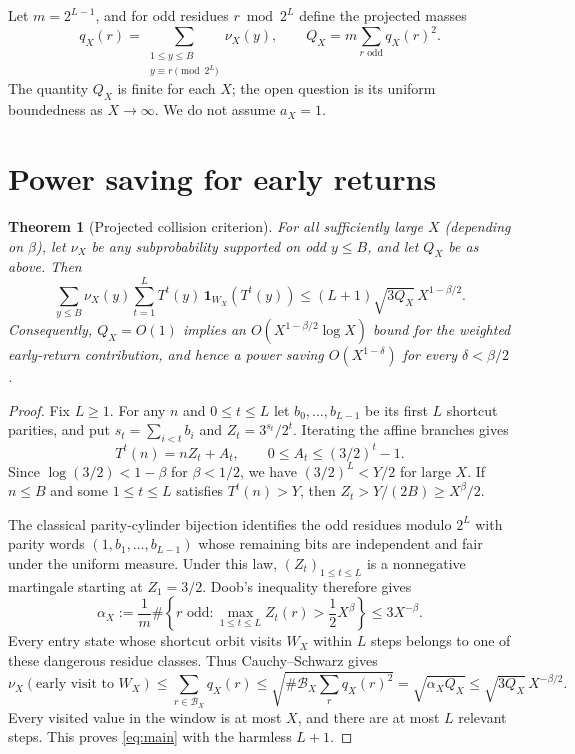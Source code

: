 \documentclass[11pt]{amsart}
\newtheorem{theorem}{Theorem}
\theoremstyle{remark}
\newcommand{\1}{\mathbf1}
\begin{document}
Let $m=2^{L-1}$, and for odd residues $r\bmod2^L$ define the projected masses
\[
 q_X(r)=\sum_{\substack{1\le y\le B\\y\equiv r\pmod{2^L}}}\nu_X(y),\qquad
 \boxed{Q_X=m\sum_{r\text{ odd}}q_X(r)^2.}
\]
The quantity $Q_X$ is finite for each $X$; the open question is its uniform boundedness as $X\to\infty$. We do not assume $a_X=1$.

\section{Power saving for early returns}
\begin{theorem}[Projected collision criterion]\label{thm:main}
For all sufficiently large $X$ (depending on $\beta$), let $\nu_X$ be any subprobability supported on odd $y\le B$, and let $Q_X$ be as above. Then
\begin{equation}\label{eq:main}
 \sum_{y\le B}\nu_X(y)\sum_{t=1}^{L}
 T^t(y)\,\1_{W_X}(T^t(y))
 \le (L+1)\sqrt{3Q_X}\,X^{1-\beta/2}.
\end{equation}
Consequently, $Q_X=O(1)$ implies an $O(X^{1-\beta/2}\log X)$ bound for the weighted \emph{early-return} contribution, and hence a power saving $O(X^{1-\delta})$ for every $\delta<\beta/2$.
\end{theorem}
\begin{proof}
Fix $L\ge1$. For any $n$ and $0\le t\le L$ let $b_0,\ldots,b_{L-1}$ be its first $L$ shortcut parities, and put $s_t=\sum_{i<t}b_i$ and $Z_t=3^{s_t}/2^t$. Iterating the affine branches gives
\[
 T^t(n)=nZ_t+A_t,\qquad 0\le A_t\le(3/2)^t-1.
\]
Since $\log(3/2)<1-\beta$ for $\beta<1/2$, we have $(3/2)^L<Y/2$ for large $X$.  If $n\le B$ and some $1\le t\le L$ satisfies $T^t(n)>Y$, then $Z_t>Y/(2B)\ge X^\beta/2$.

The classical parity-cylinder bijection identifies the odd residues modulo $2^L$ with parity words $(1,b_1,\ldots,b_{L-1})$ whose remaining bits are independent and fair under the uniform measure.  Under this law, $(Z_t)_{1\le t\le L}$ is a nonnegative martingale starting at $Z_1=3/2$.  Doob's inequality therefore gives
\[
 \alpha_X:=\frac1m\#\left\{r\text{ odd}:\max_{1\le t\le L} Z_t(r)>\frac12X^\beta\right\}
 \le3X^{-\beta}.
\]
Every entry state whose shortcut orbit visits $W_X$ within $L$ steps belongs to one of these dangerous residue classes. Thus Cauchy--Schwarz gives
\[
 \nu_X(\text{early visit to }W_X)
 \le \sum_{r\in\mathcal B_X}q_X(r)
 \le \sqrt{\#\mathcal B_X\sum_rq_X(r)^2}
 =\sqrt{\alpha_X Q_X}\le\sqrt{3Q_X}\,X^{-\beta/2}.
\]
Every visited value in the window is at most $X$, and there are at most $L$ relevant steps. This proves \eqref{eq:main} with the harmless $L+1$.
\end{proof}
\end{document}

